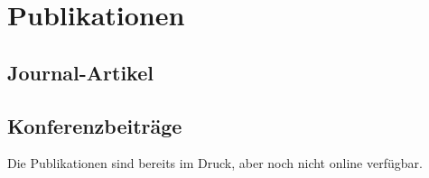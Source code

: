 \documentclass[11pt]{article}
\begin{document}


\section{Publikationen}


\nocite{kleiner.2017,kleiner.2017a,kleiner.2021,kleiner.2021a,kleiner.2021b,kleiner.2021c,kleiner.2021d,kleiner.2021e,kleiner.2021f,kleiner.2021g,kleiner.2021h,kleiner.2022,kleiner.2022a,kleiner.2022b,kleiner.2024,kleiner.2024a,kleiner.2025b,kleiner.2025c,kleiner.2025d,kleiner.2025f,kleiner.2026,kleiner.2026a,kleiner.2026b,kleiner.2026c,kleiner.2026d,kleiner.2026e,kleiner.2026f,kleiner.2026g,kleiner.2026h,kleiner.2026i,kleiner.2026j} %
\nocite{vogt.2018,schirmer.2019,naber.2020,jiang.2022,nguyen-tuan.2023,rossler.2023,rossler.2023a,nguyen-tuan.2024,nguyentuan.2024,li.2025,frolov.2025,shittu.2026,li.2026,li.2026a,shittu.2026a,nguyen-tuan.2026a,babazadehshareh.2026}%

\subsection{Journal-Artikel} \medskip
\newrefcontext[sorting=ynt]
\printbibliography[heading=none,keyword=myPapers]

\subsection{Konferenzbeiträge} \medskip
\newrefcontext[labelprefix={K},sorting=ynt]
\printbibliography[heading=none,keyword=myConferencePapers]
\small
Die Publikationen \cite{babazadehshareh.2026, shittu.2026a, li.2026a,nguyen-tuan.2026a,kleiner.2026g} sind bereits im Druck, aber noch nicht online verfügbar.
\end{document}
